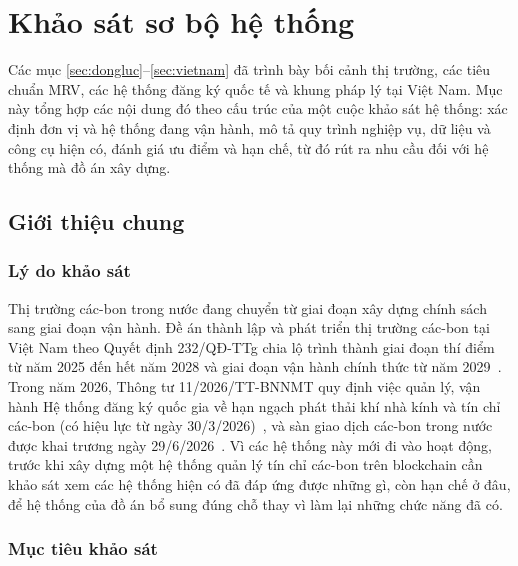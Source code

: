 \section{Khảo sát sơ bộ hệ thống}
\label{sec:khaosatsobo}

Các mục \ref{sec:dongluc}--\ref{sec:vietnam} đã trình bày bối cảnh thị trường, các tiêu chuẩn MRV, các hệ thống đăng ký quốc tế và khung pháp lý tại Việt Nam. Mục này tổng hợp các nội dung đó theo cấu trúc của một cuộc khảo sát hệ thống: xác định đơn vị và hệ thống đang vận hành, mô tả quy trình nghiệp vụ, dữ liệu và công cụ hiện có, đánh giá ưu điểm và hạn chế, từ đó rút ra nhu cầu đối với hệ thống mà đồ án xây dựng.

\FloatBarrier
\subsection*{Giới thiệu chung}
\label{subsec:ks-gioithieu}

\subsubsection*{Lý do khảo sát}

Thị trường các-bon trong nước đang chuyển từ giai đoạn xây dựng chính sách sang giai đoạn vận hành. Đề án thành lập và phát triển thị trường các-bon tại Việt Nam theo Quyết định 232/QĐ-TTg chia lộ trình thành giai đoạn thí điểm từ năm 2025 đến hết năm 2028 và giai đoạn vận hành chính thức từ năm 2029~\cite{vietnam2025qd232}. Trong năm 2026, Thông tư 11/2026/TT-BNNMT quy định việc quản lý, vận hành Hệ thống đăng ký quốc gia về hạn ngạch phát thải khí nhà kính và tín chỉ các-bon (có hiệu lực từ ngày 30/3/2026)~\cite{vietnam2026thongtu11}, và sàn giao dịch các-bon trong nước được khai trương ngày 29/6/2026~\cite{dbnd2026santhuong}. Vì các hệ thống này mới đi vào hoạt động, trước khi xây dựng một hệ thống quản lý tín chỉ các-bon trên blockchain cần khảo sát xem các hệ thống hiện có đã đáp ứng được những gì, còn hạn chế ở đâu, để hệ thống của đồ án bổ sung đúng chỗ thay vì làm lại những chức năng đã có.

\subsubsection*{Mục tiêu khảo sát}

